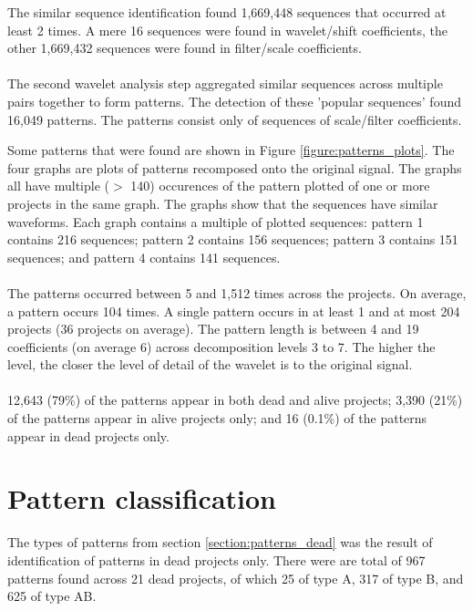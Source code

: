 The similar sequence identification found 1,669,448 sequences that occurred
at least 2 times. A mere 16 sequences were found in wavelet/shift coefficients,
the other 1,669,432 sequences were found in filter/scale coefficients.

\paragraph{}
The second wavelet analysis step aggregated similar sequences across multiple
pairs together to form patterns. The detection of these 'popular sequences'
found 16,049 patterns. The patterns consist only of sequences of scale/filter
coefficients.

Some patterns that were found are shown in Figure \ref{figure:patterns_plots}.
The four graphs are plots of patterns recomposed onto the original signal. The
graphs all have multiple ($>$ 140) occurences of the pattern plotted of one or
more projects in the same graph. The graphs show that the sequences have
similar waveforms. Each graph contains a multiple of plotted sequences: pattern
1 contains 216 sequences; pattern 2 contains 156 sequences; pattern 3 contains
151 sequences; and pattern 4 contains 141 sequences.




\paragraph{}
The patterns occurred between 5 and 1,512 times across the projects. On
average, a pattern occurs 104 times. A single pattern occurs in at least 1 and
at most 204 projects (36 projects on average). The pattern length is between 4
and 19 coefficients (on average 6) across decomposition levels 3 to 7. The
higher the level, the closer the level of detail of the wavelet is to the
original signal.

\paragraph{}

12,643 (79\%) of the patterns appear in both dead and alive projects; 3,390
(21\%) of the patterns appear in alive projects only; and 16 (0.1\%) of the
patterns appear in dead projects only.

\section{Pattern classification}
The types of patterns from section \ref{section:patterns_dead} was the result
of identification of patterns in dead projects only. There were are total of
967 patterns found across 21 dead projects, of which 25 of type A, 317 of type
B, and 625 of type AB.

